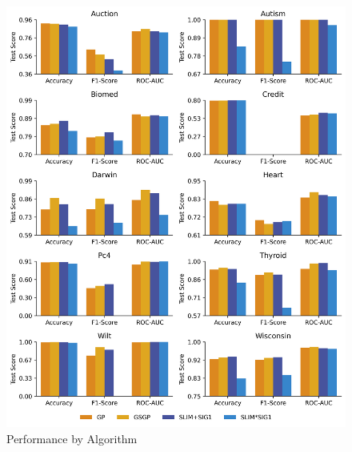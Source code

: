 
    \begin{figure}[H]
    \centering
    \includegraphics[width=\linewidth]{../Latex/Chapters/Figures/Results/comparison_performance.png}
    \caption{Performance by Algorithm}
    \label{fig:comparison_performance}
    \end{figure}
    